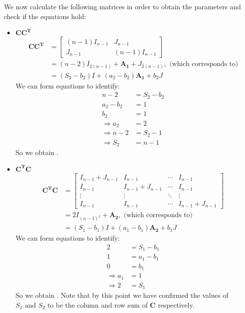 \documentclass{article}
\begin{document}
We now calculate the following matrices in order to obtain the parameters and check if the equations hold:

\begin{itemize}
    \item \(\mathbf{CC^T}\)
    \begin{align*}
        \mathbf{CC^T} &=
        \begin{bmatrix}
            (n-1)I_{n-1} & J_{n-1} \\
            J_{n-1} & (n-1)I_{n-1}
        \end{bmatrix}\\
        &= (n-2)I_{2(n-1)} + \mathbf{A_1} + J_{2(n-1)}, \text{ (which corresponds to)}\\
        &= (S_2-b_2)I + (a_2-b_2)\mathbf{A_1} + b_2J
    \end{align*}
    We can form equations to identify:
    \begin{align*}
        n -2 &= S_2 - b_2 \\
        a_2 - b_2 &= 1 \\
        b_2 &= 1 \\
        \Rightarrow a_2 &= 2 \\
        \Rightarrow n-2 &= S_2 - 1 \\
        \Rightarrow S_2 &= n-1
    \end{align*}
    So we obtain .

    \item \(\mathbf{C^T C}\)
    \begin{align*}
        \mathbf{C^T C} &=
        \begin{bmatrix}
            I_{n-1} + J_{n-1} & I_{n-1} & \cdots & I_{n-1} \\
            I_{n-1} & I_{n-1} + J_{n-1} & \cdots & I_{n-1} \\
            \vdots & \vdots & \ddots & \vdots \\
            I_{n-1} & I_{n-1} & \cdots & I_{n-1} + J_{n-1}
        \end{bmatrix} \\
        &=
        2I_{(n-1)^2} + \mathbf{A_2}, \text{ (which corresponds to)}\\
        &= (S_1-b_1)I + (a_1-b_1)\mathbf{A_2} + b_1J
    \end{align*}
    We can form equations to identify:
    \begin{align*}
        2 &= S_1 - b_1 \\
        1 &= a_1 - b_1 \\
        0 &= b_1 \\
        \Rightarrow a_1 &= 1 \\
        \Rightarrow 2 &= S_1 
    \end{align*}
    So we obtain .
    Note that by this point we have confirmed the values of $S_1 \text{ and }S_2$ to be the column and row sum of $\mathbf{C}$ respectively.


\end{itemize}
\end{document}
